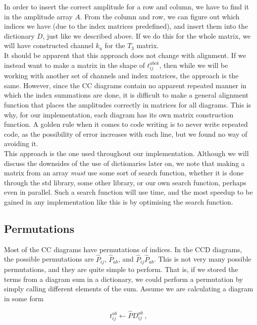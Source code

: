 \documentclass[10pt,twoside]{report}
\begin{document}
	In order to insert the correct amplitude for a row and column, we have to find it in the amplitude array $A$. From the column and row, we can figure out which indices we have (due to the index matrices predefined), and insert them into the dictionary $D$, just like we described above. If we do this for the whole matrix, we will have constructed channel $k_u$ for the $T_3$ matrix.\\
	
	It should be apparent that this approach does not change with alignment. If we instead want to make a matrix in the shape of $t_{ij}^{abck}$, then while we will be working with another set of channels and index matrices, the approach is the same. However, since the CC diagrams contain no apparent repeated manner in which the index summations are done, it is difficult to make a general alignment function that places the amplitudes correctly in matrices for all diagrams. This is why, for our implementation, each diagram has its own matrix construction function. A golden rule when it comes to code writing is to never write repeated code, as the possibility of error increases with each line, but we found no way of avoiding it.\\
	
	This approach is the one used throughout our implementation. Although we will discuss the downsides of the use of dictionaries later on, we note that making a matrix from an array \emph{must} use some sort of search function, whether it is done through the std library, some other library, or our own search function, perhaps even in parallel. Such a search function will use time, and the most speedup to be gained in any implementation like this is by optimising the search function.
	
	\subsection{Permutations}
	\label{Implementation | sec | "permutations"}
	Most of the CC diagrams have permutations of indices. In the CCD diagrams, the possible permutations are $\hat{P}_{ij}$, $\hat{P}_{ab}$, and $\hat{P}_{ij}\hat{P}_{ab}$. This is not very many possible permutations, and they are quite simple to perform. That is, if we stored the terms from a diagram sum in a dictionary, we could perform a permutation by simply calling different elements of the sum. Assume we are calculating a diagram in some form
	
	\begin{equation}
		t_{ij}^{ab} \leftarrow \hat{P}D_{ij}^{ab}\:,
	\end{equation}
	
\end{document}
